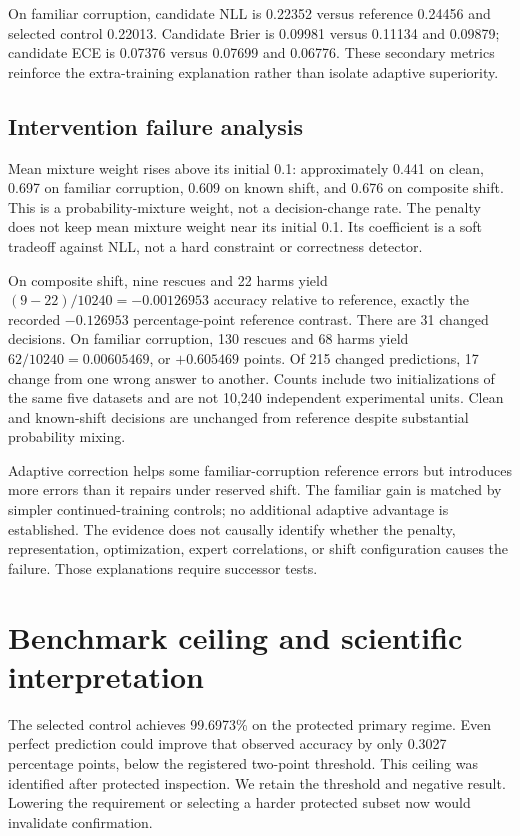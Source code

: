On familiar corruption, candidate NLL is 0.22352 versus reference 0.24456 and
selected control 0.22013. Candidate Brier is 0.09981 versus 0.11134 and 0.09879;
candidate ECE is 0.07376 versus 0.07699 and 0.06776. These secondary metrics
reinforce the extra-training explanation rather than isolate adaptive superiority.

\subsection{Intervention failure analysis}

Mean mixture weight rises above its initial 0.1: approximately 0.441 on clean,
0.697 on familiar corruption, 0.609 on known shift, and 0.676 on composite
shift. This is a probability-mixture weight, not a decision-change rate. The
penalty does not keep mean mixture weight near its initial 0.1. Its coefficient is a soft
tradeoff against NLL, not a hard constraint or correctness detector.

On composite shift, nine rescues and 22 harms yield
$(9-22)/10240=-0.00126953$ accuracy relative to reference, exactly the recorded
$-0.126953$ percentage-point reference contrast. There are 31 changed decisions.
On familiar corruption, 130 rescues and 68 harms yield
$62/10240=0.00605469$, or $+0.605469$ points. Of 215 changed predictions, 17
change from one wrong answer to another. Counts include two initializations of
the same five datasets and are not 10,240 independent experimental units.
Clean and known-shift decisions are unchanged from reference despite substantial
probability mixing.

Adaptive correction helps some familiar-corruption reference errors but
introduces more errors than it repairs under reserved shift. The familiar gain is matched by simpler continued-training controls; no
additional adaptive advantage is established. The evidence does not causally identify
whether the penalty, representation, optimization, expert correlations, or
shift configuration causes the failure. Those explanations require successor tests.

\section{Benchmark ceiling and scientific interpretation}
The selected control achieves 99.6973\% on the protected primary regime.
Even perfect prediction could improve that observed accuracy by only 0.3027
percentage points, below the registered two-point threshold. This ceiling was
identified after protected inspection. We retain the threshold and negative
result. Lowering the requirement or selecting a harder protected subset now
would invalidate confirmation.

